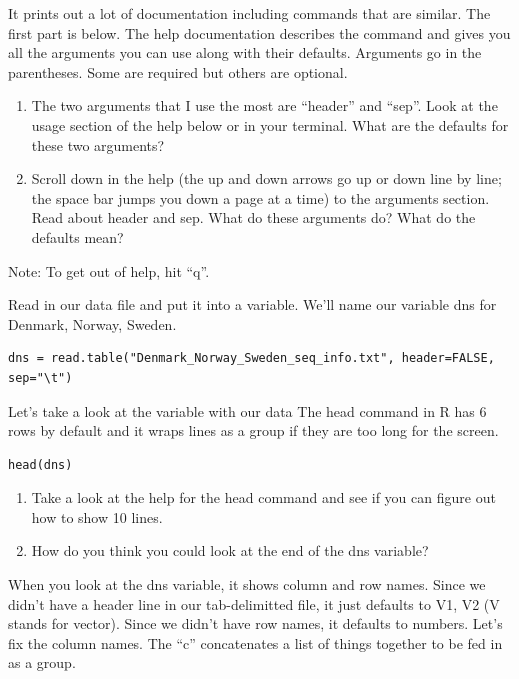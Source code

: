 \documentclass[
]{book}
\begin{document}
It prints out a lot of documentation including commands that are similar. The first part is below. The help documentation describes the command and gives you all the arguments you can use along with their defaults. Arguments go in the parentheses. Some are required but others are optional.

\begin{enumerate}
\def\labelenumi{\arabic{enumi}.}
\setcounter{enumi}{11}
\item
  The two arguments that I use the most are ``header'' and ``sep''. Look at the usage section of the help below or in your terminal. What are the defaults for these two arguments?
\item
  Scroll down in the help (the up and down arrows go up or down line by line; the space bar jumps you down a page at a time) to the arguments section. Read about header and sep. What do these arguments do? What do the defaults mean?
\end{enumerate}

Note: To get out of help, hit ``q''.

Read in our data file and put it into a variable. We'll name our variable dns for Denmark, Norway, Sweden.

\begin{verbatim}
dns = read.table("Denmark_Norway_Sweden_seq_info.txt", header=FALSE, sep="\t")
\end{verbatim}

Let's take a look at the variable with our data The head command in R has 6 rows by default and it wraps lines as a group if they are too long for the screen.

\begin{verbatim}
head(dns)
\end{verbatim}

\begin{enumerate}
\def\labelenumi{\arabic{enumi}.}
\setcounter{enumi}{13}
\item
  Take a look at the help for the head command and see if you can figure out how to show 10 lines.
\item
  How do you think you could look at the end of the dns variable?
\end{enumerate}

When you look at the dns variable, it shows column and row names. Since we didn't have a header line in our tab-delimitted file, it just defaults to V1, V2 (V stands for vector). Since we didn't have row names, it defaults to numbers. Let's fix the column names. The ``c'' concatenates a list of things together to be fed in as a group.
\end{document}

